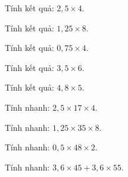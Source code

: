 
\begin{ex}
  Tính kết quả: $2{,}5 \times 4$.
\end{ex}

\begin{ex}
  Tính kết quả: $1{,}25 \times 8$.
\end{ex}

\begin{ex}
  Tính kết quả: $0{,}75 \times 4$.
\end{ex}

\begin{ex}
  Tính kết quả: $3{,}5 \times 6$.
\end{ex}

\begin{ex}
  Tính kết quả: $4{,}8 \times 5$.
\end{ex}

\begin{ex}
  Tính nhanh: $2{,}5 \times 17 \times 4$.
\end{ex}

\begin{ex}
  Tính nhanh: $1{,}25 \times 35 \times 8$.
\end{ex}

\begin{ex}
  Tính nhanh: $0{,}5 \times 48 \times 2$.
\end{ex}

\begin{ex}
  Tính nhanh: $3{,}6 \times 45 + 3{,}6 \times 55$.
\end{ex}

